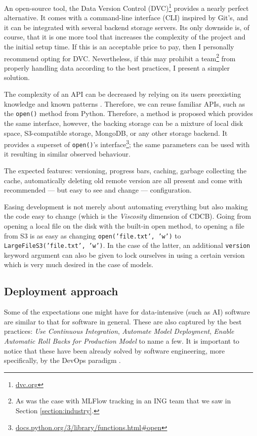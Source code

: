 An open-source tool, the Data Version Control (DVC)\footnote{\href{https://dvc.org/}{dvc.org}} provides a nearly perfect alternative. It comes with a command-line interface (CLI) inspired by Git's, and it can be integrated with several backend storage servers. Its only downside is, of course, that it is one more tool that increases the complexity of the project and the initial setup time. If this is an acceptable price to pay, then I personally recommend opting for DVC. Nevertheless, if this may prohibit a team\footnote{As was the case with MLFlow tracking in an ING team that we saw in Section \ref{section:industry}.} from properly handling data according to the best practices, I present a simpler solution.

The complexity of an API can be decreased by relying on its users preexisting knowledge and known patterns \cite{hermans2021programmer,ousterhout2018philosophy}. Therefore, we can reuse familiar APIs, such as the \texttt{open()} method from Python. Therefore, a method is proposed which provides the same interface, however, the backing storage can be a mixture of local disk space, S3-compatible storage, MongoDB, or any other storage backend. It provides a superset of \texttt{open()}'s interface\footnote{\href{https://docs.python.org/3/library/functions.html\#open}{docs.python.org/3/library/functions.html\#open}}; the same parameters can be used with it resulting in similar observed behaviour.

The expected features: versioning, progress bars, caching, garbage collecting the cache, automatically deleting old remote version are all present and come with recommended --- but easy to see and change --- configuration.

Easing development is not merely about automating everything but also making the code easy to change (which is the \textit{Viscosity} dimension of CDCB). Going from opening a local file on the disk with the built-in open method, to opening  a file from S3 is as easy as changing \texttt{open('file.txt', 'w')} to \texttt{LargeFileS3('file.txt', 'w')}. In the case of the latter, an additional \texttt{version} keyword argument can also be given to lock ourselves in using a certain version which is very much desired in the case of models.

\subsection{Deployment approach}

Some of the expectations one might have for data-intensive (such as AI) software are similar to that for software in general. These are also captured by the best practices: \textit{Use Continuous Integration}, \textit{Automate Model Deployment}, \textit{Enable Automatic Roll Backs for Production Model} to name a few. It is important to notice that these have been already solved by software engineering, more specifically, by the DevOps paradigm \cite{leite2019survey}. 

